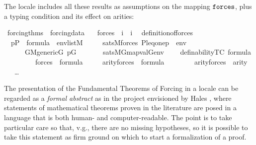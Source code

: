 The locale  includes all these results as assumptions on the
mapping $\mathop{\mathtt{forces}}$, plus a typing condition  and its
effect on arities:
\begin{isabelle}
\isamarkupfalse%
\ forcing{\isacharunderscore}thms\ {\isacharequal}\ forcing{\isacharunderscore}data\ {\isacharplus}\isanewline
\ \ forces\ {\isacharcolon}{\isacharcolon}\ {\isachardoublequoteopen}i\ {\isasymRightarrow}\ i{\isachardoublequoteclose}\isanewline
\ \
definition{\isacharunderscore}of{\isacharunderscore}forces{\isacharcolon}\isanewline 
\ \ {\isachardoublequoteopen}p{\isasymin}P\ {\isasymLongrightarrow}\ {\isasymphi}{\isasymin}formula\ {\isasymLongrightarrow}\ env{\isasymin}list{\isacharparenleft}M{\isacharparenright}\ {\isasymLongrightarrow}\isanewline
\ \ \ \  sats{\isacharparenleft}M{\isacharcomma}forces{\isacharparenleft}{\isasymphi}{\isacharparenright}{\isacharcomma}\ {\isacharbrackleft}P{\isacharcomma}leq{\isacharcomma}one{\isacharcomma}p{\isacharbrackright}\ {\isacharat}\ env{\isacharparenright}\ {\isasymlongleftrightarrow}\isanewline
\ \ \ \ \ \
{\isacharparenleft}{\isasymforall}G{\isachardot}{\isacharparenleft}M{\isacharunderscore}generic{\isacharparenleft}G{\isacharparenright}{\isasymand}\
p{\isasymin}G{\isacharparenright}\ {\isasymlongrightarrow}\isanewline 
\ \ \ \ \ \ sats{\isacharparenleft}M{\isacharbrackleft}G{\isacharbrackright}{\isacharcomma}{\isasymphi}{\isacharcomma}map{\isacharparenleft}val{\isacharparenleft}G{\isacharparenright}{\isacharcomma}env{\isacharparenright}{\isacharparenright}{\isacharparenright}{\isachardoublequoteclose}\isanewline
\ \ \isakeyword{and}\ \ definability{\isacharbrackleft}TC{\isacharbrackright}{\isacharcolon}\ {\isachardoublequoteopen}{\isasymphi}{\isasymin}formula\ {\isasymLongrightarrow}\isanewline
\ \ \ \ \ \ \ \ \  forces{\isacharparenleft}{\isasymphi}{\isacharparenright}\ {\isasymin}\ formula{\isachardoublequoteclose}\isanewline
\ \ \isakeyword{and}\ \ \ arity{\isacharunderscore}forces{\isacharcolon}\ \ {\isachardoublequoteopen}{\isasymphi}{\isasymin}formula\ {\isasymLongrightarrow}\isanewline
\ \ \ \ \ \ \
arity{\isacharparenleft}forces{\isacharparenleft}{\isasymphi}{\isacharparenright}{\isacharparenright}\
{\isacharequal}\ arity{\isacharparenleft}{\isasymphi}{\isacharparenright}\ {\isacharhash}{\isacharplus}\ {}{\isachardoublequoteclose}\isanewline
\ \ \isakeyword{and}\ \dots
\end{isabelle}

The presentation of the Fundamental Theorems of Forcing in a locale
can be regarded as a \emph{formal abstract} as in the project
envisioned by Hales \cite{hales-fabstracts}, where  statements of
mathematical theorems proven in the literature are posed in a language
that is both human- and computer-readable. The point is to take
particular care so that, v.g., there are no missing hypotheses, so it
is possible to take this statement as firm ground on which to start a
formalization of a proof. 

